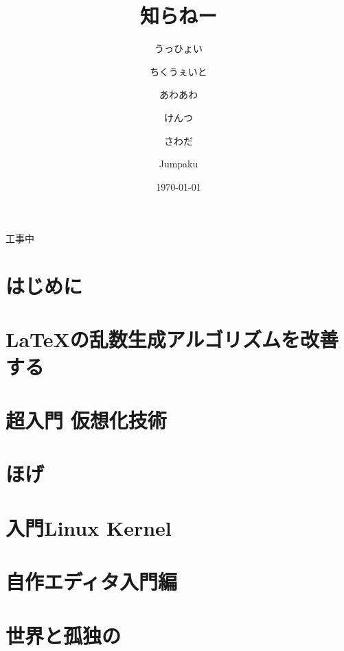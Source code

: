 \documentclass[autodetect-engine,dvipdfmx-if-dvi,ja=standard,a4paper,12pt,twoside,openany,layout=v2]{bxjsbook}
\title{知らねー}
\author{うっひょい \and ちくうぇいと \and あわあわ \and けんつ \and さわだ \and Jumpaku}
\date{\today}
\begin{document}
%
\begin{titlepage}
  \begin{center}
    \Huge 工事中
  \end{center}
\end{titlepage}

\maketitle
\frontmatter
\chapter{はじめに}


\tableofcontents
\mainmatter
{}
\chapter{\LaTeX の乱数生成アルゴリズムを改善する}


\chapter{超入門 仮想化技術}


\chapter{ほげ}


\chapter{入門Linux Kernel}


\chapter{自作エディタ入門編}


\chapter{世界と孤独の}


\newpage
\myimpression
\end{document}

